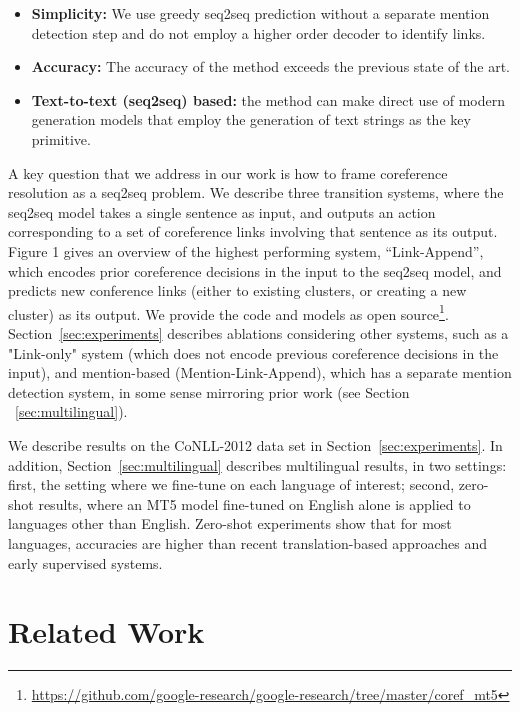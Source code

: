 \documentclass[11pt,a4paper]{article}
\newcommand{\LA}{Link-Append}
\newcommand{\M}{Mention-Link-Append}
\newcommand{\LO}{Link-only}
\begin{document}
\begin{itemize}
    \item {\bf Simplicity:} We use greedy seq2seq prediction without a separate mention detection step and do not employ a higher order decoder to identify links. 

    \item {\bf Accuracy:} The accuracy of the method exceeds the previous state of the art. 
    \item {\bf Text-to-text (seq2seq) based:} the method can make direct use of modern generation models that employ the generation of text strings as the key primitive.
\end{itemize}

A key question that we address in our work is how to frame coreference resolution as a seq2seq problem. We describe three transition systems, where the seq2seq model takes a single sentence as input, and outputs an action corresponding to a set of coreference links involving that sentence as its output. Figure 1 gives an overview of the highest performing system, “\LA”, which encodes prior coreference decisions in the input to the seq2seq model, and predicts new conference links (either to existing clusters, or creating a new cluster) as its output.
We provide the code and models as open source\footnote{\url{https://github.com/google-research/google-research/tree/master/coref_mt5}}.
Section~\ref{sec:experiments} describes ablations considering other systems, such as a "\LO" system (which does not encode previous coreference decisions in the input), and mention-based (\M), which has a separate mention detection system, in some sense mirroring prior work (see Section ~\ref{sec:multilingual}). 

We describe results on the CoNLL-2012 data set in Section~\ref{sec:experiments}.
In addition,  Section~\ref{sec:multilingual} describes multilingual results, in two settings: first, the setting where we fine-tune on each language of interest; second, zero-shot results, where an MT5 model fine-tuned on English alone is applied to languages other than English. 
Zero-shot experiments show that for most languages, accuracies are higher than recent translation-based approaches and early supervised systems. 







 
\section{Related Work}
\label{sec:related}
\end{document}
